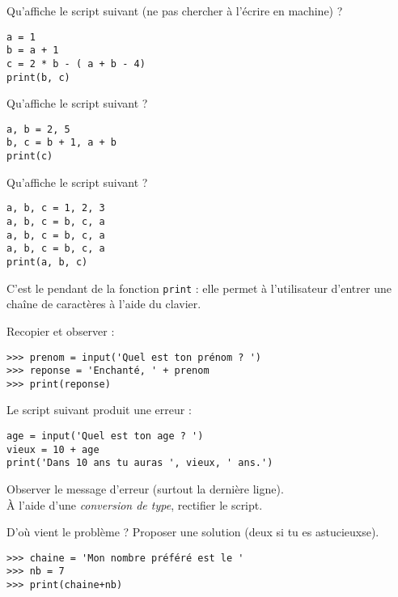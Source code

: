 \begin{exercice}[ : affectations 1]

    Qu'affiche le script suivant (ne pas chercher à l'écrire en machine) ?
\begin{verbatim}
a = 1
b = a + 1
c = 2 * b - ( a + b - 4)
print(b, c)
\end{verbatim}
\end{exercice}

\begin{exercice}[ : affectations 2]
    Qu'affiche le script suivant ?
    
    \begin{verbatim}
a, b = 2, 5
b, c = b + 1, a + b
print(c)
    \end{verbatim}
    \end{exercice}

    \begin{exercice}[ : affectations 3]
        Qu'affiche le script suivant ?
        \begin{verbatim}    
a, b, c = 1, 2, 3
a, b, c = b, c, a
a, b, c = b, c, a
a, b, c = b, c, a
print(a, b, c)
        \end{verbatim}
    \end{exercice}

\begin{exercice}

    C'est le pendant de la fonction \texttt{print} : elle permet à l'utilisateur d'entrer une chaîne de caractères à l'aide du clavier.

    Recopier et observer :
\begin{verbatim}
>>> prenom = input('Quel est ton prénom ? ')
>>> reponse = 'Enchanté, ' + prenom
>>> print(reponse)
\end{verbatim}
\end{exercice}

\begin{exercice}

    Le script suivant produit une erreur :
\begin{verbatim}
age = input('Quel est ton age ? ')
vieux = 10 + age
print('Dans 10 ans tu auras ', vieux, ' ans.')
\end{verbatim}
    Observer le message d'erreur (surtout la dernière ligne).\\
    À l'aide d'une \textit{conversion de type}, rectifier le script.
\end{exercice}
\begin{exercice}
D'où vient le problème ? Proposer une solution (deux si tu es astucieu\cdot x\cdot se).
\begin{verbatim}
>>> chaine = 'Mon nombre préféré est le '
>>> nb = 7
>>> print(chaine+nb)
\end{verbatim}
\end{exercice}

